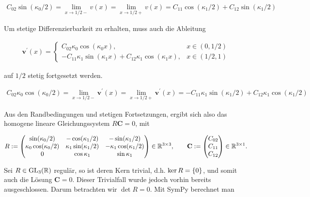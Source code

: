 \begin{align*}
  C_{02} \sin(\kappa_0/2)
  = \lim_{x \to 1/2-} v(x)
  = \lim_{x \to 1/2+} v(x)
  = C_{11} \cos(\kappa_1/2) + C_{12} \sin(\kappa_1/2)
\end{align*}

Um stetige Differenzierbarkeit zu erhalten, muss auch die Ableitung

\begin{align*}
  \mathbf{v}^\prime(x) =
  \begin{cases}
    C_{02} \kappa_0 \cos(\kappa_0 x),
    & x \in (0, 1/2) \\
    - C_{11} \kappa_1 \sin(\kappa_1 x) + C_{12} \kappa_1 \cos(\kappa_1 x),
    & x \in (1/2, 1)
  \end{cases}
\end{align*}

auf $1/2$ stetig fortgesetzt werden.

\begin{align*}
  C_{02} \kappa_0 \cos(\kappa_0/2)
  = \lim_{x \to 1/2-} \mathbf{v}^\prime(x)
  = \lim_{x \to 1/2+} \mathbf{v}^\prime(x)
  = - C_{11} \kappa_1 \sin(\kappa_1/2) + C_{12} \kappa_1 \cos(\kappa_1/2)
\end{align*}

Aus den Randbedingungen und stetigen Fortsetzungen, ergibt sich also das homogene lineare Gleichungssystem $R \mathbf{C} = 0$, mit

\begin{align*}
  R :=
  \begin{pmatrix}
    \sin(\kappa_0/2)          & -\cos(\kappa_1/2)         & -\sin(\kappa_1/2) \\
    \kappa_0 \cos(\kappa_0/2) & \kappa_1 \sin(\kappa_1/2) & - \kappa_1 \cos(\kappa_1/2) \\
    0                         & \cos{\kappa_1}            & \sin{\kappa_1}
  \end{pmatrix}
  \in \R^{3 \times 3}, \qquad
  \mathbf{C} :=
  \begin{pmatrix}
    C_{02} \\
    C_{11} \\
    C_{12}
  \end{pmatrix}
  \in \R^{3 \times 1}.
\end{align*}

Sei $R \in \GL[3]{\R}$ regulär, so ist deren Kern trivial, d.h. $\ker{R} = \Bbraces{0}$, und somit auch die Lösung $\mathbf{C} = 0$. Dieser Trivialfall wurde jedoch vorhin bereits ausgeschlossen. Darum betrachten wir $\det{R} = 0$. Mit SymPy berechnet man

